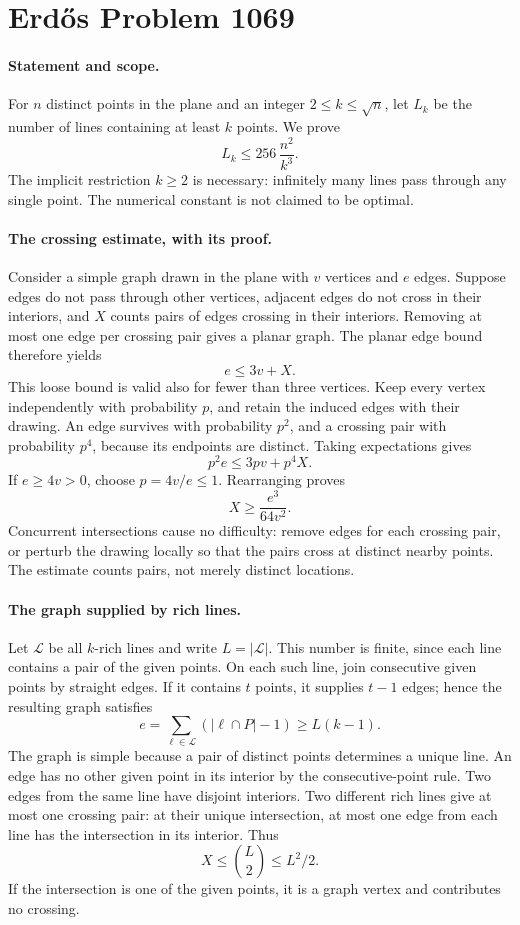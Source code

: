 \section*{Erd\H{o}s Problem 1069}

\paragraph{Statement and scope.}
For \(n\) distinct points in the plane and an integer \(2\leq k\leq\sqrt n\), let \(L_k\) be the number of lines containing at least \(k\) points. We prove
\[
 L_k\leq256\,\frac{n^2}{k^3}.
\]
The implicit restriction \(k\geq2\) is necessary: infinitely many lines pass through any single point. The numerical constant is not claimed to be optimal.

\paragraph{The crossing estimate, with its proof.}
Consider a simple graph drawn in the plane with \(v\) vertices and \(e\) edges. Suppose edges do not pass through other vertices, adjacent edges do not cross in their interiors, and \(X\) counts pairs of edges crossing in their interiors. Removing at most one edge per crossing pair gives a planar graph. The planar edge bound therefore yields
\[
 e\leq3v+X.
\]
This loose bound is valid also for fewer than three vertices. Keep every vertex independently with probability \(p\), and retain the induced edges with their drawing. An edge survives with probability \(p^2\), and a crossing pair with probability \(p^4\), because its endpoints are distinct. Taking expectations gives
\[
 p^2e\leq3pv+p^4X.
\]
If \(e\geq4v>0\), choose \(p=4v/e\leq1\). Rearranging proves
\[
 X\geq\frac{e^3}{64v^2}. \tag{1}
\]
Concurrent intersections cause no difficulty: remove edges for each crossing pair, or perturb the drawing locally so that the pairs cross at distinct nearby points. The estimate counts pairs, not merely distinct locations.

\paragraph{The graph supplied by rich lines.}
Let \(\mathcal L\) be all \(k\)-rich lines and write \(L=|\mathcal L|\). This number is finite, since each line contains a pair of the given points. On each such line, join consecutive given points by straight edges. If it contains \(t\) points, it supplies \(t-1\) edges; hence the resulting graph satisfies
\[
 e=\sum_{\ell\in\mathcal L}(|\ell\cap P|-1)\geq L(k-1).
\]
The graph is simple because a pair of distinct points determines a unique line. An edge has no other given point in its interior by the consecutive-point rule. Two edges from the same line have disjoint interiors. Two different rich lines give at most one crossing pair: at their unique intersection, at most one edge from each line has the intersection in its interior. Thus
\[
 X\leq\binom L2\leq L^2/2. \tag{2}
\]
If the intersection is one of the given points, it is a graph vertex and contributes no crossing.

